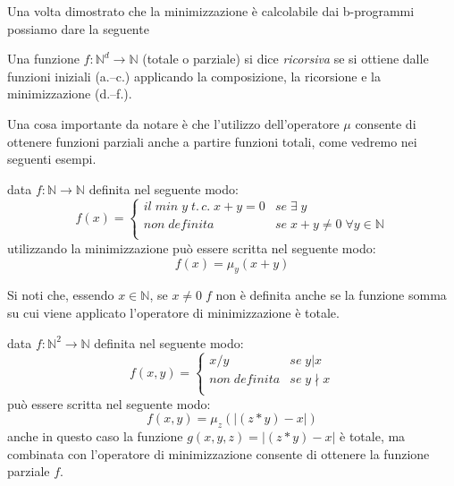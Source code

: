 Una volta dimostrato che la minimizzazione è calcolabile dai
b-programmi possiamo dare la seguente
\begin{definizione} Una funzione $f:\mathbb{N}^{d} \to \mathbb{N}$ (totale o
parziale) si dice \emph{ricorsiva} se si ottiene dalle funzioni
iniziali (a.--c.) applicando la composizione, la ricorsione e la
minimizzazione (d.--f.).
\end{definizione}

Una cosa importante da notare \`e che l'utilizzo dell'operatore $\mu$ consente
di ottenere funzioni parziali anche a partire funzioni totali, come vedremo nei
seguenti esempi.
\begin{esempio} data $f:\mathbb{N} \to \mathbb{N}$ definita nel seguente modo:
$$f(x)= \left\{ \begin{array}{ll}
il \; min \; y \; t. \, c. \; x+y=0 & se \; \exists \; y\\
non \; definita & se \; x+y \neq 0 \; \forall y \in \mathbb{N}\\
\end{array} \right.$$
utilizzando la minimizzazione pu\`o essere scritta nel seguente modo:
$$f(x)= \mu_{y}(x+y)$$

Si noti che, essendo $x \in \mathbb{N}$, se $x \neq 0 \; f$ non \`e definita
anche se la funzione somma su cui viene applicato l'operatore di minimizzazione
\`e totale.
\end{esempio}

\begin{esempio} data $f:\mathbb{N}^{2} \to \mathbb{N}$ definita nel seguente
modo:
$$f(x,y)= \left\{ \begin{array}{ll}
x/y & se \; y \vert x\\
non \; definita & se \; y \nmid x\\
\end{array} \right.$$
pu\`o essere scritta nel seguente modo:
$$f(x,y) = \mu_{z}(\vert (z*y) - x \vert) $$
anche in questo caso la funzione $g(x,y,z)=\vert (z*y) - x \vert$ \`e totale, ma
combinata con l'operatore di minimizzazione consente di ottenere la funzione
parziale $f$.
\end{esempio}

